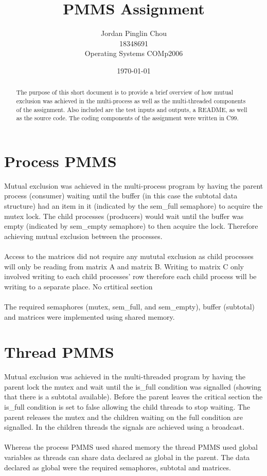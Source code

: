 \documentclass{article}
\begin{document}
\author{Jordan Pinglin Chou\\
  18348691\\
  Operating Systems COMp2006\\}
\date{\today}
\title{PMMS Assignment}
\maketitle

\begin{abstract}
  The purpose of this short document is to provide a brief overview of
  how mutual exclusion was achieved in the multi-process as well as
  the multi-threaded components of the assignment. Also included are
  the test inputs and outputs, a README, as well as the source code. The coding
  components of the assignment were written in C99.
\end{abstract}

\section{Process PMMS}
Mutual exclusion was achieved in the multi-process program by having the parent
process (consumer) waiting until the buffer (in this case the subtotal data structure)
had an item in it (indicated by the sem\_full semaphore) to acquire the mutex lock.
The child processes (producers) would wait until the buffer was empty (indicated
by sem\_empty semaphore) to then acquire the lock. Therefore achieving mutual
exclusion between the processes.
\\\\
Access to the matrices did not require any mututal exclusion as child processes
will only be reading from matrix A and matrix B. Writing to matrix C only
involved writing to each child processes’ row therefore each child process will
be writing to a separate place. No crtitical section
\\\\
The required semaphores (mutex, sem\_full, and sem\_empty), buffer (subtotal) and
matrices were implemented using shared memory.

\section{Thread PMMS}
Mutual exclusion was achieved in the multi-threaded program by having the
parent lock the mutex and wait until the is\_full condition was signalled
(showing that there is a subtotal available). Before the parent leaves the
critical section the is\_full condition is set to false allowing the child
threads to stop waiting. The parent releases the mutex and the children waiting
on the full condition are signalled. In the children threads the signals are
achieved using a broadcast.
\\\\
Whereas the process PMMS used shared memory the thread PMMS used global
variables as threads can share data declared as global in the parent. The data
declared as global were the required semaphores, subtotal and matrices.
\end{document}

